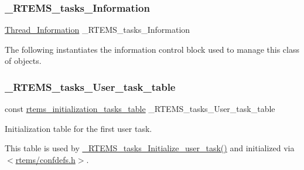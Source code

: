 \subsubsection{\texorpdfstring{\_RTEMS\_tasks\_Information}{\_RTEMS\_tasks\_Information}}
{\footnotesize\ttfamily \mbox{\hyperlink{structThread__Information}{Thread\+\_\+\+Information}} \+\_\+\+R\+T\+E\+M\+S\+\_\+tasks\+\_\+\+Information}

The following instantiates the information control block used to manage this class of objects. \mbox{\label{group__ClassicTasksImpl_ga08311c0396b6c585c4d4b0d8d971d62c}} 
\subsubsection{\texorpdfstring{\_RTEMS\_tasks\_User\_task\_table}{\_RTEMS\_tasks\_User\_task\_table}}
{\footnotesize\ttfamily const \mbox{\hyperlink{structrtems__initialization__tasks__table}{rtems\+\_\+initialization\+\_\+tasks\+\_\+table}} \+\_\+\+R\+T\+E\+M\+S\+\_\+tasks\+\_\+\+User\+\_\+task\+\_\+table}



Initialization table for the first user task. 

This table is used by \mbox{\hyperlink{group__ClassicTasksImpl_gac2c1ab4bf7c8768a39084976a8d9f669}{\+\_\+\+R\+T\+E\+M\+S\+\_\+tasks\+\_\+\+Initialize\+\_\+user\+\_\+task()}} and initialized via $<$\mbox{\hyperlink{confdefs_8h}{rtems/confdefs.\+h}}$>$. 